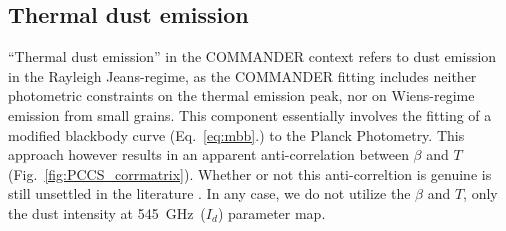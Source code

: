       \subsection{Thermal dust emission}
      ``Thermal dust emission'' in the COMMANDER context refers to dust emission in the Rayleigh Jeans-regime, as the COMMANDER fitting includes neither photometric constraints on the thermal emission peak, nor on Wiens-regime emission from small grains. This component essentially involves the fitting of a modified blackbody curve (Eq.~\ref{eq:mbb}.) to the Planck Photometry. This approach however results in an apparent anti-correlation between $\beta$ and $T$ (Fig.~\ref{fig:PCCS_corrmatrix}). Whether or not this anti-correltion is genuine is still unsettled in the literature \citep{galliano11,juvela12}. In any case, we do not utilize the $\beta$ and $T$, only the dust intensity at 545~GHz~($I_{d}$) parameter map.

